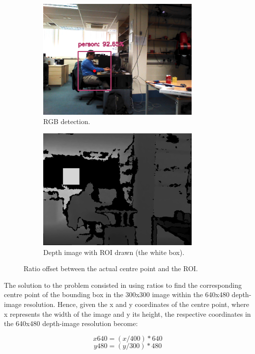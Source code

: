 \begin{figure}[H]
	\centering
    \begin{subfigure}{.6\textwidth}
      \centering
      \includegraphics[width=8cm]{images/chapter4_rgb_ratio.png}
      \caption{RGB detection.}
      \label{fig:ratin}
    \end{subfigure}%
    
    \begin{subfigure}{.6\textwidth}
      \centering
      \includegraphics[width=8cm]{images/chapter4_rgbd_no_ratio.png}
      \caption{Depth image with ROI drawn (the white box).}
      \label{fig:ration}
    \end{subfigure}%
    
    \caption{Ratio offset between the actual centre point and the ROI.}
\end{figure}
\clearpage

The solution to the problem consisted in using ratios to find the corresponding centre point of the bounding box in the 300x300 image within the 640x480 depth-image resolution. Hence, given the x and y coordinates of the centre point, where x represents the width of the image and y its height, the respective coordinates in the 640x480 depth-image resolution become:

\[x640 = (x/400) * 640 \]
\[y480 = (y/300) * 480 \]

